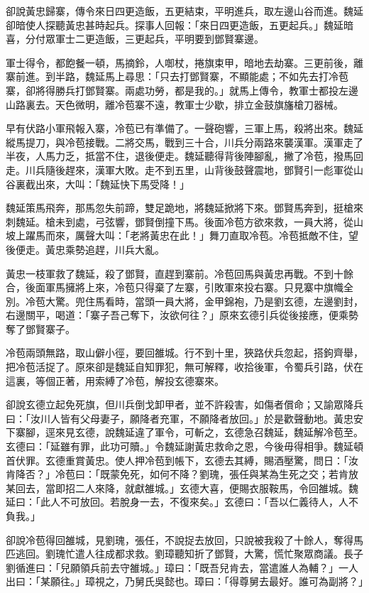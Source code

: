 卻說黃忠歸寨，傳令來日四更造飯，五更結束，平明進兵，取左邊山谷而進。魏延卻暗使人探聽黃忠甚時起兵。探事人回報：「來日四更造飯，五更起兵。」魏延暗喜，分付眾軍士二更造飯，三更起兵，平明要到鄧賢寨邊。

軍士得令，都飽餐一頓，馬摘鈴，人啣杖，捲旗束甲，暗地去劫寨。三更前後，離寨前進。到半路，魏延馬上尋思：「只去打鄧賢寨，不顯能處；不如先去打冷苞寨，卻將得勝兵打鄧賢寨。兩處功勞，都是我的。」就馬上傳令，教軍士都投左邊山路裏去。天色微明，離冷苞寨不遠，教軍士少歇，排立金鼓旗旛槍刀器械。

早有伏路小軍飛報入寨，冷苞已有準備了。一聲砲響，三軍上馬，殺將出來。魏延縱馬提刀，與冷苞接戰。二將交馬，戰到三十合，川兵分兩路來襲漢軍。漢軍走了半夜，人馬力乏，抵當不住，退後便走。魏延聽得背後陣腳亂，撇了冷苞，撥馬回走。川兵隨後趕來，漢軍大敗。走不到五里，山背後鼓聲震地，鄧賢引一彪軍從山谷裏截出來，大叫：「魏延快下馬受降！」

魏延策馬飛奔，那馬忽失前蹄，雙足跪地，將魏延掀將下來。鄧賢馬奔到，挺槍來刺魏延。槍未到處，弓弦響，鄧賢倒撞下馬。後面冷苞方欲來救，一員大將，從山坡上躍馬而來，厲聲大叫：「老將黃忠在此！」舞刀直取冷苞。冷苞抵敵不住，望後便走。黃忠乘勢追趕，川兵大亂。

黃忠一枝軍救了魏延，殺了鄧賢，直趕到寨前。冷苞回馬與黃忠再戰。不到十餘合，後面軍馬擁將上來，冷苞只得棄了左寨，引敗軍來投右寨。只見寨中旗幟全別。冷苞大驚。兜住馬看時，當頭一員大將，金甲錦袍，乃是劉玄德，左邊劉封，右邊關平，喝道：「寨子吾己奪下，汝欲何往？」原來玄德引兵從後接應，便乘勢奪了鄧賢寨子。

冷苞兩頭無路，取山僻小徑，要回雒城。行不到十里，狹路伏兵忽起，搭鉤齊舉，把冷苞活捉了。原來卻是魏延自知罪犯，無可解釋，收拾後軍，令蜀兵引路，伏在這裏，等個正著，用索縛了冷苞，解投玄德寨來。

卻說玄德立起免死旗，但川兵倒戈卸甲者，並不許殺害，如傷者償命；又諭眾降兵曰：「汝川人皆有父母妻子，願降者充軍，不願降者放回。」於是歡聲動地。黃忠安下寨腳，逕來見玄德，說魏延違了軍令，可斬之，玄德急召魏延，魏延解冷苞至。玄德曰：「延雖有罪，此功可贖。」令魏延謝黃忠救命之恩，今後毋得相爭。魏延頓首伏罪。玄德重賞黃忠。使人押冷苞到帳下，玄德去其縛，賜酒壓驚，問日：「汝肯降否？」冷苞曰：「既蒙免死，如何不降？劉瑰，張任與某為生死之交；若肯放某回去，當即招二人來降，就獻雒城。」玄德大喜，便賜衣服鞍馬，令回雒城。魏延曰：「此人不可放回。若脫身一去，不復來矣。」玄德曰：「吾以仁義待人，人不負我。」

卻說冷苞得回雒城，見劉瑰，張任，不說捉去放回，只說被我殺了十餘人，奪得馬匹逃回。劉瑰忙遣人往成都求救。劉璋聽知折了鄧賢，大驚，慌忙聚眾商議。長子劉循進曰：「兒願領兵前去守雒城。」璋曰：「既吾兒肯去，當遣誰人為輔？」一人出曰：「某願往。」璋視之，乃舅氏吳懿也。璋曰：「得尊舅去最好。誰可為副將？」


